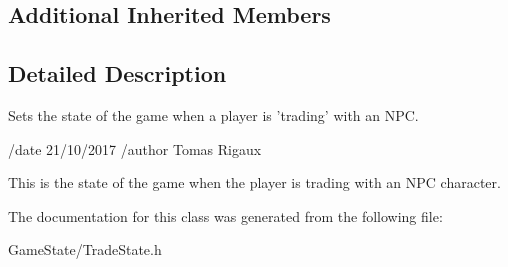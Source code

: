 \subsection*{Additional Inherited Members}


\subsection{Detailed Description}
Sets the state of the game when a player is 'trading' with an N\-P\-C. 

/date 21/10/2017 /author Tomas Rigaux

This is the state of the game when the player is trading with an N\-P\-C character. 

The documentation for this class was generated from the following file\-:\begin{DoxyCompactItemize}
\item 
Game\-State/Trade\-State.\-h\end{DoxyCompactItemize}
